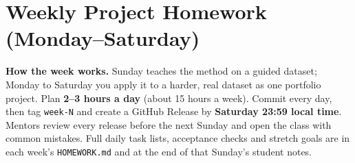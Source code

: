 \section{Weekly Project Homework (Monday--Saturday)}\label{sec:homework}
\begin{navynote}
\textbf{\color{gold}How the week works.} Sunday teaches the method on a guided dataset; Monday to Saturday you apply it to a harder, real dataset as one portfolio project. Plan \textbf{2--3 hours a day} (about 15 hours a week). Commit every day, then tag \texttt{week-N} and create a GitHub Release by \textbf{Saturday 23:59 local time}. Mentors review every release before the next Sunday and open the class with common mistakes. Full daily task lists, acceptance checks and stretch goals are in each week's \texttt{HOMEWORK.md} and at the end of that Sunday's student notes.
\end{navynote}

